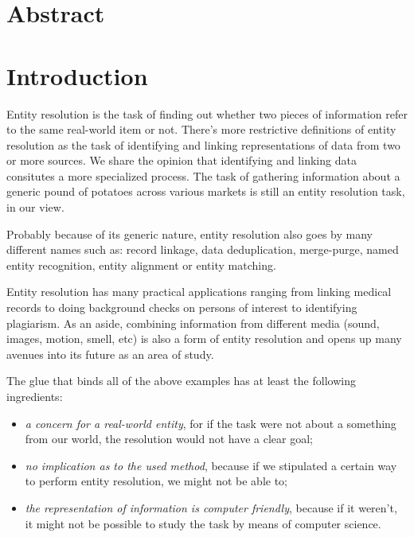 \documentclass[11pt]{article}
\begin{document}
    \theoremstyle{definition}
    \newtheorem{defn}{Definition}[section]
    
    \section{Abstract}\label{sec:abstract}


    \section{Introduction}\label{sec:introduction}
    Entity resolution is the task of finding out whether two pieces of
    information refer to the same real-world item or not.
    There's more restrictive definitions of entity resolution as the task of
    identifying and linking representations of data from two or more
    sources\cite{Qia17}.
    We share the opinion that identifying and linking data consitutes a more
    specialized process\cite{Tal11}.
    The task of gathering information about a generic pound of potatoes across
    various markets is still an entity resolution task, in our view.
    
    Probably because of its generic nature, entity resolution also goes by many
    different names such as: record linkage, data deduplication, merge-purge,
    named entity recognition, entity alignment or entity
    matching\cite{Tal11,fever2009}.

    Entity resolution has many practical applications ranging from linking
    medical records to doing background checks on persons of interest to 
    identifying plagiarism.
    As an aside, combining information from different media (sound, images,
    motion, smell, etc) is also a form of entity resolution and opens up many
    avenues into its future as an area of study.

    The glue that binds all of the above examples has at least the following
    ingredients:
    \begin{itemize}
        \item\textit{a concern for a real-world entity}, for if the task were
        not about a something from our world, the resolution would not have a
        clear goal;
        \item\textit{no implication as to the used method}, because if we
        stipulated a certain way to perform entity resolution, we might not be
        able to;
        \item\textit{the representation of information is computer friendly},
        because if it weren't, it might not be possible to study the task by
        means of computer science.
    \end{itemize}
\end{document}
